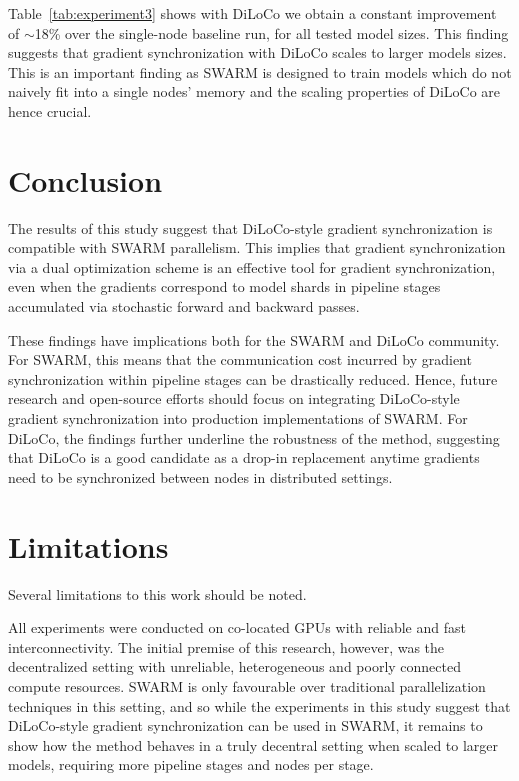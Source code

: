 \documentclass{article}
\begin{document}
Table~\ref{tab:experiment3} shows with DiLoCo we obtain a constant improvement
of $\sim$18\% over the single-node baseline run, for all tested model sizes.
This finding suggests that gradient synchronization with DiLoCo scales to larger
models sizes. This is an important finding as SWARM is designed to train models
which do not naively fit into a single nodes' memory and the scaling properties
of DiLoCo are hence crucial.

\section{Conclusion}

The results of this study suggest that DiLoCo-style gradient synchronization is
compatible with SWARM parallelism. This implies that gradient 
synchronization via a dual optimization scheme is an effective tool for gradient
synchronization, even when the gradients correspond to model shards in pipeline
stages accumulated via stochastic forward and backward passes.

These findings have implications both for the SWARM and DiLoCo community. For
SWARM, this means that the communication cost incurred by gradient
synchronization within pipeline stages can be drastically reduced. Hence, future
research and open-source efforts should focus on integrating DiLoCo-style 
gradient synchronization into production implementations of SWARM. For DiLoCo,
the findings further underline the robustness of the method, suggesting that
DiLoCo is a good candidate as a drop-in replacement anytime gradients need to be
synchronized between nodes in distributed settings.

\section{Limitations}

Several limitations to this work should be noted.

All experiments were conducted on co-located GPUs with reliable and fast
interconnectivity. The initial premise of this research, however, was the
decentralized setting with unreliable, heterogeneous and poorly connected
compute resources. SWARM is only favourable over traditional parallelization
techniques in this setting, and so while the experiments in this study suggest
that DiLoCo-style gradient synchronization can be used in SWARM, it remains to
show how the method behaves in a truly decentral setting when scaled to larger
models, requiring more pipeline stages and nodes per stage.
\end{document}
